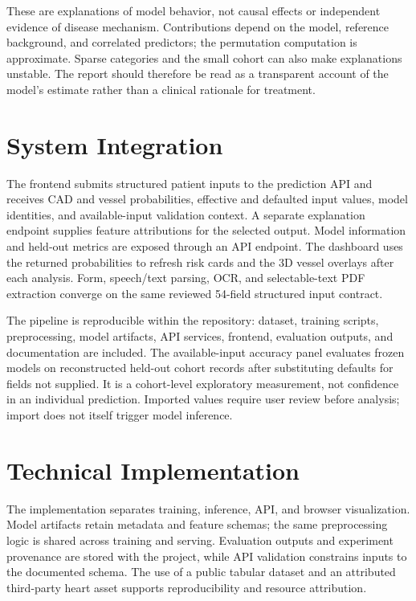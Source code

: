 \documentclass[10pt]{article}
\begin{document}
These are explanations of model behavior, not causal effects or independent evidence of disease mechanism. Contributions depend on the model, reference background, and correlated predictors; the permutation computation is approximate. Sparse categories and the small cohort can also make explanations unstable. The report should therefore be read as a transparent account of the model's estimate rather than a clinical rationale for treatment.

\section{System Integration}
The frontend submits structured patient inputs to the prediction API and receives CAD and vessel probabilities, effective and defaulted input values, model identities, and available-input validation context. A separate explanation endpoint supplies feature attributions for the selected output. Model information and held-out metrics are exposed through an API endpoint. The dashboard uses the returned probabilities to refresh risk cards and the 3D vessel overlays after each analysis. Form, speech/text parsing, OCR, and selectable-text PDF extraction converge on the same reviewed 54-field structured input contract.

The pipeline is reproducible within the repository: dataset, training scripts, preprocessing, model artifacts, API services, frontend, evaluation outputs, and documentation are included. The available-input accuracy panel evaluates frozen models on reconstructed held-out cohort records after substituting defaults for fields not supplied. It is a cohort-level exploratory measurement, not confidence in an individual prediction. Imported values require user review before analysis; import does not itself trigger model inference.

\section{Technical Implementation}
The implementation separates training, inference, API, and browser visualization. Model artifacts retain metadata and feature schemas; the same preprocessing logic is shared across training and serving. Evaluation outputs and experiment provenance are stored with the project, while API validation constrains inputs to the documented schema. The use of a public tabular dataset and an attributed third-party heart asset supports reproducibility and resource attribution.
\end{document}
